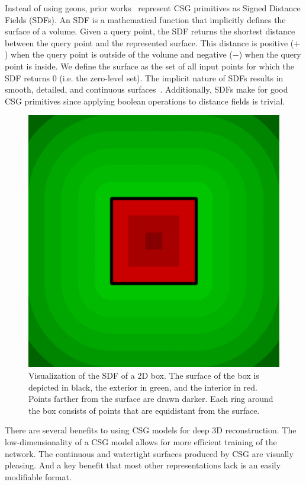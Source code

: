 Instead of using geons, prior works~\cite{Sharma2018, Kania2020, Ren2021} represent CSG primitives as Signed Distance Fields (SDFs). An SDF is a mathematical function that implicitly defines the surface of a volume. Given a query point, the SDF returns the shortest distance between the query point and the represented surface. This distance is positive ($+$) when the query point is outside of the volume and negative ($-$) when the query point is inside. We define the surface as the set of all input points for which the SDF returns 0 (i.e. the zero-level set). The implicit nature of SDFs results in smooth, detailed, and continuous surfaces~\cite{Park2019}. Additionally, SDFs make for good CSG primitives since applying boolean operations to distance fields is trivial.

\begin{figure}
	\centering
	\includegraphics[scale=0.2]{Images/SDF Box}
	\caption{Visualization of the SDF of a 2D box. The surface of the box is depicted in black, the exterior in green, and the interior in red. Points farther from the surface are drawn darker. Each ring around the box consists of points that are equidistant from the surface.}
	\label{fig:sdf_box}
\end{figure}

There are several benefits to using CSG models for deep 3D reconstruction. The low-dimensionality of a CSG model allows for more efficient training of the network. The continuous and watertight surfaces produced by CSG are visually pleasing. And a key benefit that most other representations lack is an easily modifiable format.

